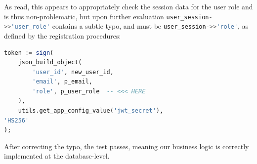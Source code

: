 \documentclass[journal]{IEEEtran}
\begin{document}
	As read, this appears to appropriately check the session data for the user role and is thus non-problematic, but upon further evaluation \lstinline[language=SQL]|user_session->>'user_role'| contains a subtle typo, and must be \lstinline[language=SQL]|user_session->>'role'|, as defined by the registration procedures:
	
	\begin{lstlisting}[language=SQL]
token := sign(
	json_build_object(
		'user_id', new_user_id,
		'email', p_email,
		'role', p_user_role  -- <<< HERE
	),
	utils.get_app_config_value('jwt_secret'),
'HS256'
);
	\end{lstlisting}
	
	After correcting the typo, the test passes, meaning our business logic is correctly implemented at the database-level.
\end{document}
